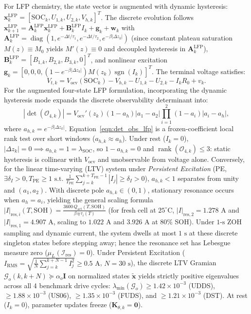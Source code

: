 \documentclass[preprint,12pt]{elsarticle}
\begin{document}
For LFP chemistry, the state vector is augmented with dynamic hysteresis: $\mathbf{x}_k^{\text{LFP}} = [\text{SOC}_k, U_{1,k}, U_{2,k}, V_{h,k}]^T$. The discrete evolution follows $\mathbf{x}_{k+1}^{\text{LFP}} = \mathbf{A}_k^{\text{LFP}} \mathbf{x}_k^{\text{LFP}} + \mathbf{B}_k^{\text{LFP}} I_k + \mathbf{g}_k + \mathbf{w}_k$ with $\mathbf{A}_k^{\text{LFP}} = \operatorname{diag}(1, e^{-\Delta t/\tau_1}, e^{-\Delta t/\tau_2}, e^{-\beta|\Delta z_k|})$ (since constant plateau saturation $M(z) \equiv M_0$ yields $M'(z) \equiv 0$ and decoupled hysteresis in $\mathbf{A}_k^{\text{LFP}}$), $\mathbf{B}_k^{\text{LFP}} = [B_{1,k}, B_{2,k}, B_{3,k}, 0]^T$, and nonlinear excitation $\mathbf{g}_k = [0, 0, 0, (1 - e^{-\beta |\Delta z_k|}) M(z_k) \operatorname{sgn}(I_k)]^T$. The terminal voltage satisfies:
\begin{equation}\label{eqn:vt_lfp}
V_{t,k} = V_{\text{ocv}}(\text{SOC}_k) - V_{h,k} - U_{1,k} - U_{2,k} - I_k R_0 + v_k.
\end{equation}
For the augmented four-state LFP formulation, incorporating the dynamic hysteresis mode expands the discrete observability determinant into:
\begin{equation}\label{eqn:det_obs_lfp}
|\det(\mathcal{O}_{4,k})| = V_{\text{ocv}}'(z_k)(1 - a_h)|a_1 - a_2|\prod_{i=1}^2 (1 - a_i)|a_i - a_h|,
\end{equation}
where $a_{h,k} = e^{-\beta |\Delta z_k|}$. Equation~\eqref{eqn:det_obs_lfp} is a frozen-coefficient local rank test over short windows ($a_{h,k} \approx a_h$). Under rest ($I_k = 0$), $|\Delta z_k| = 0 \implies a_{h,k} = 1 = \lambda_{\text{SOC}}$, so $1 - a_{h,k} = 0$ and $\operatorname{rank}(\mathcal{O}_{4,k}) \le 3$: static hysteresis is collinear with $V_{\text{ocv}}$ and unobservable from voltage alone. Conversely, for the linear time-varying (LTV) system under \emph{Persistent Excitation} (PE, $\exists \delta_I > 0, T_{\text{PE}} \ge 1 \text{ s.t. } \frac{1}{T_{\text{PE}}} \sum_{j=k}^{k+T_{\text{PE}}-1} |I_j| \ge \delta_I > 0$), $a_{h,k} < 1$ separates from unity and $(a_1, a_2)$. With discrete pole $a_{h,k} \in (0, 1)$, stationary resonance occurs when $a_{h} = a_i$, yielding the general scaling formula $|I|_{\text{res},i}(T, \text{SOH}) = \frac{3600\,Q_{\text{act}}(T, \text{SOH})}{\beta\,\eta\,\tau_i(T)}$ (for fresh cell at $25^\circ\text{C}$, $|I|_{\text{res},2} = 1.278\text{ A}$ and $|I|_{\text{res},1} = 4.907\text{ A}$, scaling to $1.022\text{ A}$ and $3.926\text{ A}$ at $80\%$ SOH). Under $1\text{-s}$ ZOH sampling and dynamic current, the system dwells at most $1\text{ s}$ at these discrete singleton states before stepping away; hence the resonance set has Lebesgue measure zero ($\mu_L(\mathcal{I}_{\text{res}}) = 0$). Under Persistent Excitation ($I_{\text{RMS}} = \sqrt{\frac{1}{N}\sum_{j=k}^{k+N-1} I_j^2} \ge 0.5\text{ A}$, $N = 30\text{ s}$), the discrete LTV Gramian $\mathcal{G}_o(k, k+N) \succeq \alpha_o \mathbf{I}$ on normalized states $\tilde{\mathbf{x}}$ yields strictly positive eigenvalues across all 4 benchmark drive cycles: $\lambda_{\min}(\mathcal{G}_o) \ge 1.42 \times 10^{-3}$ (UDDS), $\ge 1.88 \times 10^{-3}$ (US06), $\ge 1.35 \times 10^{-3}$ (FUDS), and $\ge 1.21 \times 10^{-3}$ (DST). At rest ($I_k = 0$), parameter updates freeze ($\mathbf{K}_{\theta,k} = \mathbf{0}$).
\end{document}
